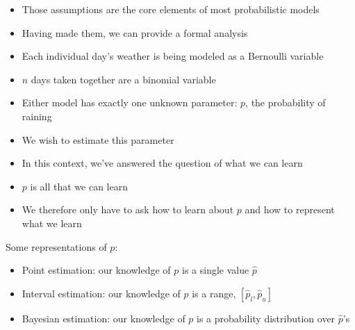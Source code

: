 \documentclass{beamer}
\begin{document}
\frame
{
  \begin{itemize}
    \item{Those assumptions are the core elements of most probabilistic models}
    \item{Having made them, we can provide a formal analysis}
  \end{itemize}
}

\frame
{
  \begin{itemize}
    \item{Each individual day's weather is being modeled as a Bernoulli variable}
    \item{$n$ days taken together are a binomial variable}
    \item{Either model has exactly one unknown parameter: $p$, the probability of raining}
    \item{We wish to estimate this parameter}
  \end{itemize}
}

\frame
{
 \begin{itemize}
   \item{In this context, we've answered the question of what we can learn}
   \item{$p$ is all that we can learn}
   \item{We therefore only have to ask how to learn about $p$ and how to represent what we learn}
 \end{itemize}
}

\frame
{
 Some representations of $p$:
 \begin{itemize}
   \item{Point estimation: our knowledge of $p$ is a single value $\hat{p}$}
   \item{Interval estimation: our knowledge of $p$ is a range, $[\hat{p}_{l}, \hat{p}_{u}]$}
   \item{Bayesian estimation: our knowledge of $p$ is a probability distribution over $\hat{p}$'s}
 \end{itemize}
}
\end{document}
